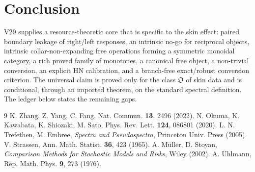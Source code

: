 \documentclass[11pt]{article}
\theoremstyle{definition}
\theoremstyle{remark}
\begin{document}
\section{Conclusion}

V29 supplies a resource-theoretic core that is specific to the skin effect: paired boundary leakage of right/left responses, an intrinsic no-go for reciprocal objects, intrinsic collar-non-expanding free operations forming a symmetric monoidal category, a rich proved family of monotones, a canonical free object, a non-trivial conversion, an explicit HN calibration, and a branch-free exact/robust conversion criterion. The universal claim is proved only for the class $\mathfrak O$ of skin data and is conditional, through an imported theorem, on the standard spectral definition. The ledger below states the remaining gaps.

\begin{thebibliography}{9}
 K. Zhang, Z. Yang, C. Fang, Nat. Commun. \textbf{13}, 2496 (2022).
 N. Okuma, K. Kawabata, K. Shiozaki, M. Sato, Phys. Rev. Lett. \textbf{124}, 086801 (2020).
 L. N. Trefethen, M. Embree, \emph{Spectra and Pseudospectra}, Princeton Univ. Press (2005).
 V. Strassen, Ann. Math. Statist. \textbf{36}, 423 (1965).
 A. M\"uller, D. Stoyan, \emph{Comparison Methods for Stochastic Models and Risks}, Wiley (2002).
 A. Uhlmann, Rep. Math. Phys. \textbf{9}, 273 (1976).
\end{thebibliography}
\end{document}

